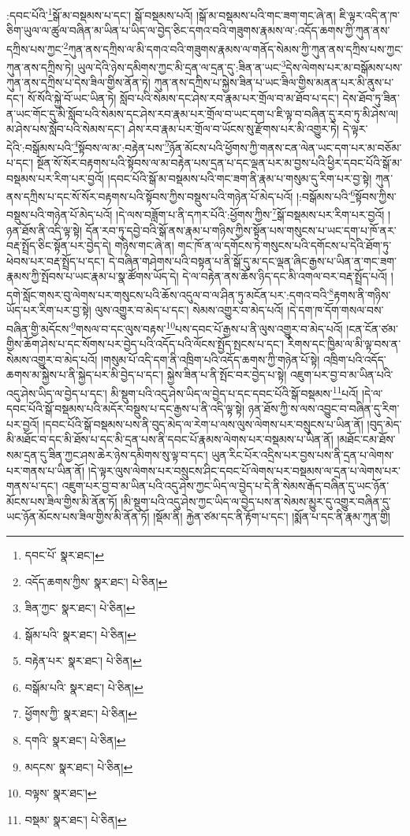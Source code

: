:དབང་པོའི་\footnote{དབང་པོ་  སྣར་ཐང་། }སྒོ་མ་བསྡམས་པ་དང་། སྒོ་བསྡམས་པའོ། །སྒོ་མ་བསྡམས་པའི་གང་ཟག་གང་ཞེ་ན། ཇི་ལྟར་འདི་ན་ཁ་ཅིག་ཡུལ་ལ་ཚུལ་བཞིན་མ་ཡིན་པ་ཡིད་ལ་བྱེད་ཅིང་དགའ་བའི་གཟུགས་རྣམས་ལ་:འདོད་ཆགས་ཀྱི་ཀུན་ནས་དཀྲིས་པས་ཀྱང་\footnote{འདོད་ཆགས་ཀྱིས་  སྣར་ཐང་།  པེ་ཅིན། }ཀུན་ནས་དཀྲིས་ལ་མི་དགའ་བའི་གཟུགས་རྣམས་ལ་གནོད་སེམས་ཀྱི་ཀུན་ནས་དཀྲིས་པས་ཀྱང་ཀུན་ནས་དཀྲིས་ཏེ། ཡུལ་དེའི་ཉེས་དམིགས་ཀྱང་མི་དྲན་ལ་དྲན་དུ་:ཟིན་ན་ཡང་\footnote{ཟིན་ཀྱང་  སྣར་ཐང་།  པེ་ཅིན། }དེས་ལེགས་པར་མ་བསྒོམས་པས་ཀུན་ནས་དཀྲིས་པ་དེས་ཟིལ་གྱིས་ནོན་ཏེ། ཀུན་ནས་དཀྲིས་པ་སྐྱེས་ཟིན་པ་ཡང་ཟིལ་གྱིས་མནན་པར་མི་ནུས་པ་དང་། སོ་སོའི་སྐྱེ་བོ་ཡང་ཡིན་ཏེ། སློབ་པའི་སེམས་དང་ཤེས་རབ་རྣམ་པར་གྲོལ་བ་མ་ཐོབ་པ་དང་། དེས་ཐོབ་ཏུ་ཟིན་ན་ཡང་གོང་དུ་མི་སློབ་པའི་སེམས་དང་ཤེས་རབ་རྣམ་པར་གྲོལ་བ་ཡང་དག་པ་ཇི་ལྟ་བ་བཞིན་དུ་རབ་ཏུ་མི་ཤེས་ལ། མ་ཤེས་པས་སློབ་པའི་སེམས་དང་། ཤེས་རབ་རྣམ་པར་གྲོལ་བ་ཡོངས་སུ་རྫོགས་པར་མི་འགྱུར་ཏེ། དེ་ལྟར་དེའི་:བསྒོམས་པའི་\footnote{སྒོམ་པའི་  སྣར་ཐང་།  པེ་ཅིན། }སྟོབས་ལ་མ་:བརྟེན་པས་\footnote{བརྟེན་པར་  སྣར་ཐང་།  པེ་ཅིན། }ཉོན་མོངས་པའི་ཕྱོགས་ཀྱི་གནས་ངན་ལེན་ཡང་དག་པར་མ་བཅོམ་པ་དང་། སྔོན་སོ་སོར་བརྟགས་པའི་སྟོབས་ལ་མ་བརྟེན་པས་དྲན་པ་དང་ལྡན་པར་མ་བྱས་པའི་ཕྱིར་དབང་པོའི་སྒོ་མ་བསྡམས་པར་རིག་པར་བྱའོ། །དབང་པོའི་སྒོ་མ་བསྡམས་པའི་གང་ཟག་ནི་རྣམ་པ་གསུམ་དུ་རིག་པར་བྱ་སྟེ། ཀུན་ནས་དཀྲིས་པ་དང་སོ་སོར་བརྟགས་པའི་སྟོབས་ཀྱིས་བསྡུས་པའི་གཉེན་པོ་མེད་པའོ། །:བསྒོམས་པའི་\footnote{བསྒོམ་པའི་  སྣར་ཐང་།  པེ་ཅིན། }སྟོབས་ཀྱིས་བསྡུས་པའི་གཉེན་པོ་མེད་པའོ། །དེ་ལས་བཟློག་པ་ནི་དཀར་པོའི་:ཕྱོགས་ཀྱིས་\footnote{ཕྱོགས་ཀྱི་  སྣར་ཐང་།  པེ་ཅིན། }སྒོ་བསྡམས་པར་རིག་པར་བྱའོ། །ཉན་ཐོས་ནི་འདི་ལྟ་སྟེ། དོན་རབ་ཏུ་དབྱེ་བའི་སྒོ་ནས་རྣམ་པ་གཉིས་ཀྱིས་སྟོན་པས་གསུངས་པ་ཡང་དག་པ་ཁོ་ནར་བརྡ་སྤྲོད་ཅིང་སྟོན་པར་བྱེད་དེ། གཉིས་གང་ཞེ་ན། གང་ཁོ་ན་ལ་དགོངས་ཏེ་གསུངས་པའི་དགོངས་པ་དེའི་ཐོག་ཏུ་ཕེབས་པར་བརྡ་སྤྲོད་པ་དང་། དེ་བཞིན་གཤེགས་པའི་བསྟན་པ་ནི་སྒོ་དུ་མ་དང་ལྡན་ཞིང་རྒྱས་པ་ཡིན་ན་གང་ཟག་རྣམས་ཀྱི་སྤོབས་པ་ཡང་རྣམ་པ་སྣ་ཚོགས་ཡོད་དེ། དེ་ལ་བརྟེན་ནས་ཆོས་ཉིད་དང་མི་འགལ་བར་བརྡ་སྤྲོད་པའོ། །དགེ་སློང་གསར་བུ་ལེགས་པར་གསུངས་པའི་ཆོས་འདུལ་བ་ལ་ཤིན་ཏུ་མངོན་པར་:དགའ་བའི་\footnote{དགའི་  སྣར་ཐང་།  པེ་ཅིན། }རྟགས་ནི་གཉིས་ཡོད་པར་རིག་པར་བྱ་སྟེ། ལུས་འགྱུར་བ་མེད་པ་དང་། སེམས་འགྱུར་བ་མེད་པའོ། །དེ་དག་ཁ་དོག་གསལ་བས་བཞིན་གྱི་མདོངས་\footnote{མདངས་  སྣར་ཐང་།  པེ་ཅིན། }གསལ་བ་དང་ལུས་བརྟས་\footnote{བལྟས་  སྣར་ཐང་། }པས་དབང་པོ་རྒྱས་པ་ནི་ལུས་འགྱུར་བ་མེད་པའོ། །ངན་ངོན་ཙམ་གྱིས་ཆོག་ཤེས་པ་དང་སོགས་པར་བྱེད་པའི་འདོད་པའི་ལོངས་སྤྱོད་སྤངས་པ་དང་། རིགས་དང་ཁྱིམ་ལ་མི་ལྟ་བས་ན་སེམས་འགྱུར་བ་མེད་པའོ། །གསུམ་པོ་འདི་དག་ནི་འཁྲིག་པའི་འདོད་ཆགས་ཀྱི་གཉེན་པོ་སྟེ། འཁྲིག་པའི་འདོད་ཆགས་མ་སྐྱེས་པ་ནི་སྐྱེད་པར་མི་བྱེད་པ་དང་། སྐྱེས་ཟིན་པ་ནི་སྤོང་བར་བྱེད་པ་སྟེ། འཇུག་པར་བྱ་བ་མ་ཡིན་པའི་འདུ་ཤེས་ཡིད་ལ་བྱེད་པ་དང་། མི་སྡུག་པའི་འདུ་ཤེས་ཡིད་ལ་བྱེད་པ་དང་དབང་པོའི་སྒོ་བསྡམས་\footnote{བསྡམ་  སྣར་ཐང་།  པེ་ཅིན། }པའོ། །དེ་ལ་དབང་པོའི་སྒོ་བསྡམས་པའི་མདོར་བསྡུས་པ་དང་རྒྱས་པ་ནི་འདི་ལྟ་སྟེ། ཉན་ཐོས་ཀྱི་ས་ལས་འབྱུང་བ་བཞིན་དུ་རིག་པར་བྱའོ། །དབང་པོའི་སྒོ་བསྡམས་པས་ནི་བུད་མེད་ལ་རེག་པ་ལས་ལུས་ལེགས་པར་བསྲུངས་པ་ཡིན་ནོ། །བུད་མེད་མི་མཐོང་བ་དང་མི་ཐོས་པ་དང་མི་དྲན་པས་ནི་དབང་པོ་རྣམས་ལེགས་པར་བསྡམས་པ་ཡིན་ནོ། །མཐོང་ངམ་ཐོས་སམ་དྲན་དུ་ཟིན་ཀྱང་ཤས་ཆེར་ཉེས་དམིགས་སུ་ལྟ་བ་དང་། ཡུན་རིང་པོར་འདྲིས་པར་བྱས་པས་ནི་དྲན་པ་ལེགས་པར་གནས་པ་ཡིན་ནོ། །དེ་ལྟར་ལུས་ལེགས་པར་བསྲུངས་ཤིང་དབང་པོ་ལེགས་པར་བསྡམས་ལ་དྲན་པ་ལེགས་པར་གནས་པ་དང་། འཇུག་པར་བྱ་བ་མ་ཡིན་པའི་འདུ་ཤེས་ཀྱང་ཡིད་ལ་བྱེད་པ་དེ་ནི་སེམས་རྒོད་བཞིན་དུ་ཡང་ཉོན་མོངས་པས་ཟིལ་གྱིས་མི་ནོན་ཏོ། །མི་སྡུག་པའི་འདུ་ཤེས་ཀྱང་ཡིད་ལ་བྱེད་པས་ན་སེམས་མྱུར་དུ་འགྱུར་བཞིན་དུ་ཡང་ཉོན་མོངས་པས་ཟིལ་གྱིས་མི་ནོན་ཏོ། །སྡོམ་ནི། རྐྱེན་ཙམ་དང་ནི་རྟོག་པ་དང་། །སྨོན་པ་དང་ནི་རྣམ་ཀུན་གྱི། 